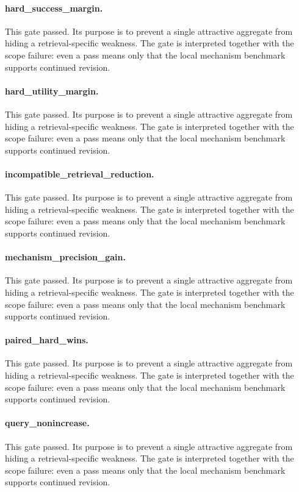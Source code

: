 \documentclass{article}
\begin{document}
\paragraph{hard\_success\_margin.} This gate passed. Its purpose is to prevent a single attractive aggregate from hiding a retrieval-specific weakness. The gate is interpreted together with the scope failure: even a pass means only that the local mechanism benchmark supports continued revision.
\paragraph{hard\_utility\_margin.} This gate passed. Its purpose is to prevent a single attractive aggregate from hiding a retrieval-specific weakness. The gate is interpreted together with the scope failure: even a pass means only that the local mechanism benchmark supports continued revision.
\paragraph{incompatible\_retrieval\_reduction.} This gate passed. Its purpose is to prevent a single attractive aggregate from hiding a retrieval-specific weakness. The gate is interpreted together with the scope failure: even a pass means only that the local mechanism benchmark supports continued revision.
\paragraph{mechanism\_precision\_gain.} This gate passed. Its purpose is to prevent a single attractive aggregate from hiding a retrieval-specific weakness. The gate is interpreted together with the scope failure: even a pass means only that the local mechanism benchmark supports continued revision.
\paragraph{paired\_hard\_wins.} This gate passed. Its purpose is to prevent a single attractive aggregate from hiding a retrieval-specific weakness. The gate is interpreted together with the scope failure: even a pass means only that the local mechanism benchmark supports continued revision.
\paragraph{query\_nonincrease.} This gate passed. Its purpose is to prevent a single attractive aggregate from hiding a retrieval-specific weakness. The gate is interpreted together with the scope failure: even a pass means only that the local mechanism benchmark supports continued revision.
\end{document}
